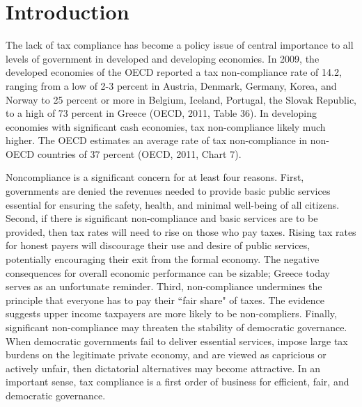 \documentclass[12pt,titlepage]{article}
\renewcommand{\thefootnote}{\fnsymbol{footnote}}
\begin{document}
\renewcommand{\thefootnote}{\arabic{footnote}}

\section{Introduction}

The lack of tax compliance has become a policy issue of central importance to all levels of government in developed and developing economies. In 2009, the developed economies of the OECD reported a tax non-compliance rate of 14.2, ranging from a low of 2-3 percent in Austria, Denmark, Germany, Korea, and Norway to 25 percent or more in Belgium, Iceland, Portugal, the Slovak Republic, to a high of 73 percent in Greece (OECD, 2011, Table 36). In developing economies with significant cash economies, tax non-compliance likely much higher. The OECD estimates an average rate of tax non-compliance in non-OECD countries of 37 percent (OECD, 2011, Chart 7).

Noncompliance is a significant concern for at least four reasons. 
First, governments are denied the revenues needed to provide basic public services 
essential for ensuring the safety, health, and minimal well-being of all citizens. 
Second, if there is significant non-compliance and basic services are to be provided, then tax
rates will need to rise on those who pay taxes. Rising tax rates for honest payers
will discourage their use and desire of public services, potentially encouraging their exit
from the formal economy. The negative consequences for overall economic
performance can be sizable; Greece today serves as an unfortunate reminder. 
Third, non-compliance undermines the principle that everyone has to pay their ``fair share" of taxes. 
The evidence suggests upper income taxpayers are more likely to be non-compliers. 
Finally, significant non-compliance may threaten the stability of democratic governance. 
When democratic governments fail to deliver essential services, impose large tax burdens 
on the legitimate private economy, and are viewed as capricious or actively unfair, 
then dictatorial alternatives may become attractive. In an important sense, tax compliance is a first order of business for efficient, fair, and democratic governance.
\end{document}
